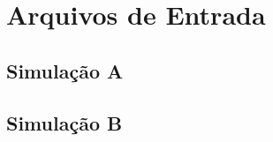 

\chapter{Arquivos de Entrada}
\label{chap:Arquivos-de-Entrada}

\lipsum[30]


\section{Simulação A}
\label{sec:Simulação-A}

\lipsum[31-33]


\section{Simulação B}
\label{sec:Simulação-B}

\lipsum[35-40]
